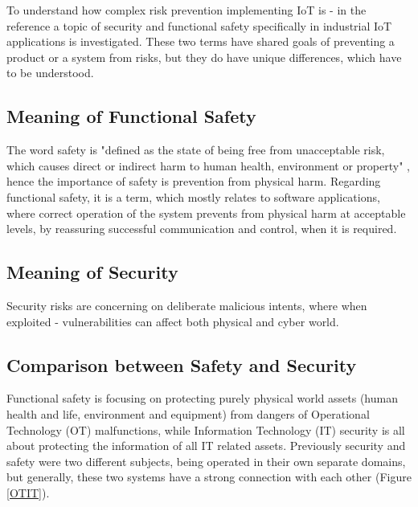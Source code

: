 \documentclass[conference]{IEEEtran}
\begin{document}
To understand how complex risk prevention implementing IoT is - in the reference \cite{tomur_sok_2021} a topic of security and functional safety specifically in industrial IoT applications is investigated. These two terms have shared goals of preventing a product or a system from risks, but they do have unique differences, which have to be understood.

\subsection{Meaning of Functional Safety}

The word safety is "defined as the state of being free from unacceptable risk, which causes direct or indirect harm to human health, environment or property" \cite{tomur_sok_2021}, hence the importance of safety is prevention from physical harm. Regarding functional safety, it is a term, which mostly relates to software applications, where correct operation of the system prevents from physical harm at acceptable levels, by reassuring successful communication and control, when it is required.

\subsection{Meaning of Security}

Security risks are concerning on deliberate malicious intents, where when exploited - vulnerabilities can affect both physical and cyber world.

\subsection{Comparison between Safety and Security}

Functional safety is focusing on protecting purely physical world assets (human health and life, environment and equipment) from dangers of Operational Technology (OT) malfunctions, while Information Technology (IT) security is all about protecting the information of all IT related assets. Previously security and safety were two different subjects, being operated in their own separate domains, but generally, these two systems have a strong connection with each other (Figure \ref{OTIT}).
\end{document}
